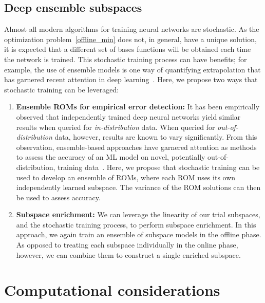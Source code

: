 \documentclass[3p,computermodern,10pt]{elsarticle}
\begin{document}
\subsection{Deep ensemble subspaces} 
Almost all modern algorithms for training neural networks are stochastic. As the optimization problem~\eqref{offline_min} does not, in general, have a unique solution, it is expected that a different set of bases functions will be obtained each time the network is trained. This stochastic training process can have benefits; for example, the use of ensemble models is one way of quantifying extrapolation that has garnered recent attention in deep learning~\cite{deep_ensembles}. Here, we propose two ways that stochastic training can be leveraged:
\begin{enumerate}
\item \textbf{Ensemble ROMs for empirical error detection:} It has been empirically observed that independently trained deep neural networks yield similar results when queried for \textit{in-distribution} data. When queried for \textit{out-of-distribution} data, however, results are known to vary significantly. From this observation, ensemble-based approaches have garnered attention as methods to assess the accuracy of an ML model on novel, potentially out-of-distribution, training data~\cite{deep_ensembles}. Here, we propose that stochastic training can be used to develop an ensemble of ROMs, where each ROM uses its own independently learned subspace. The variance of the ROM solutions can then be used to assess accuracy.   

\item \textbf{Subspace enrichment:} We can leverage the linearity of our trial subspaces, and the stochastic training process, to perform subspace enrichment. In this approach, we again train an ensemble of subspace models in the offline phase. As opposed to treating each subspace individually in the online phase, however, we can combine them to construct a single enriched subspace.
\end{enumerate}  

\section{Computational considerations}
\end{document}
